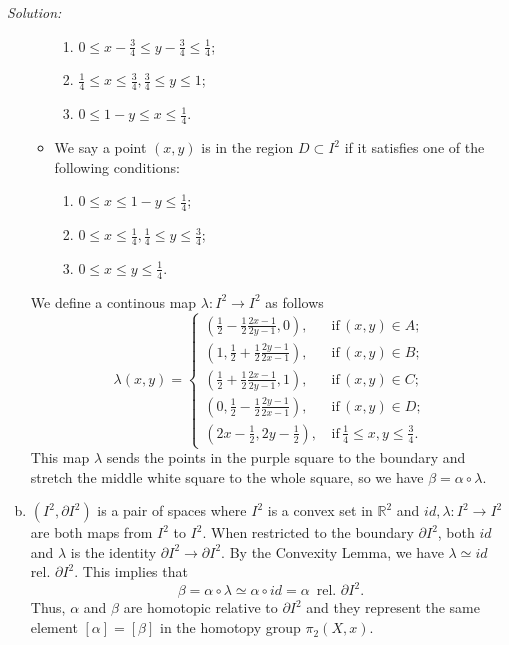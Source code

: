 \documentclass[a4paper, 12pt]{article}
\newenvironment{solution}
    {\textit{Solution:}}
    {}
\begin{document}
\begin{solution}
\begin{enumerate}[(a)]
\begin{itemize}
\begin{enumerate}[(1)]
\item \(0\leq x-\frac{3}{4}\leq y-\frac{3}{4}\leq \frac{1}{4}\);
\item \(\frac{1}{4}\leq x\leq \frac{3}{4}, \frac{3}{4}\leq y\leq 1\);
\item \(0\leq 1-y\leq x\leq \frac{1}{4}\).
\end{enumerate}
\item We say a point \((x,y)\) is in the region \(D\subset I^2\) if it satisfies one of the following conditions:
\begin{enumerate}[(1)]
\item \(0\leq x\leq 1-y\leq \frac{1}{4}\);
\item \(0\leq x\leq \frac{1}{4},\frac{1}{4}\leq y\leq \frac{3}{4}\);
\item \(0\leq x\leq y\leq \frac{1}{4}\).
\end{enumerate}
\end{itemize}
We define a continous map \(\lambda:I^2\rightarrow I^2\) as follows
\[\lambda(x,y)=\begin{cases}
    (\frac{1}{2}-\frac{1}{2}\frac{2x-1}{2y-1},0),&\, \text{if}\, (x,y)\in A;\\[5pt]
    (1,\frac{1}{2}+\frac{1}{2}\frac{2y-1}{2x-1}),&\, \text{if}\, (x,y)\in B;\\[5pt]
    (\frac{1}{2}+\frac{1}{2}\frac{2x-1}{2y-1},1),&\, \text{if}\, (x,y)\in C;\\[5pt]
    (0,\frac{1}{2}-\frac{1}{2}\frac{2y-1}{2x-1}),&\, \text{if}\, (x,y)\in D;\\[5pt]
    (2x-\frac{1}{2},2y-\frac{1}{2}),&\, \text{if}\, \frac{1}{4}\leq x,y\leq \frac{3}{4}.
\end{cases}\]
This map \(\lambda\) sends the points in the purple square to the boundary and stretch the middle white square to the whole square, so we have \(\beta=\alpha\circ \lambda\).
\item \((I^2,\partial I^2)\) is a pair of spaces where \(I^2\) is a convex set in \(\mathbb{R}^2\) and \(id,\lambda:I^2\rightarrow I^2\) are both maps from \(I^2\) to \(I^2\).  When restricted to the boundary \(\partial I^2\), both 
\(id\) and \(\lambda\) is the identity \(\partial I^2\rightarrow \partial I^2\). By the Convexity Lemma, we have \(\lambda\simeq id\) rel. \(\partial I^2\). This implies that 
\[\beta=\alpha\circ \lambda \simeq\alpha\circ id=\alpha\,\,\, \text{rel.}\,\, \partial I^2.\]
Thus, \(\alpha\) and \(\beta\) are homotopic relative to \(\partial I^2\) and they represent the same element \([\alpha]=[\beta]\) in the homotopy group \(\pi_2(X,x)\).
\end{enumerate}
\end{solution}
\end{document}
